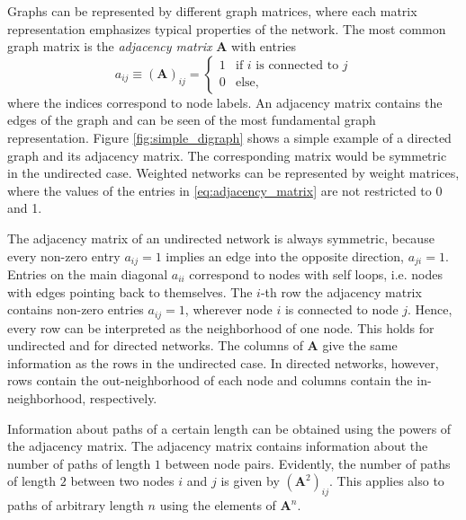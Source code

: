 Graphs can be represented by different graph matrices, where each matrix representation emphasizes typical properties of the network.
The most common graph matrix is the \emph{adjacency matrix} $\mathbf{A}$ with entries
\begin{equation}\label{eq:adjacency_matrix}
a_{ij}\equiv (\mathbf{A})_{ij}= 
\begin{cases}
1 & \text{if $i$ is connected to $j$} \\
0 & \text{else,}
\end{cases} 
\end{equation}
where the indices correspond to node labels.
An adjacency matrix contains the edges of the graph and can be seen of the most fundamental graph representation.
Figure \ref{fig:simple_digraph} shows a simple example of a directed graph and its adjacency matrix.
The corresponding matrix would be symmetric in the undirected case.
Weighted networks can be represented by weight matrices, where the values of the entries in \eqref{eq:adjacency_matrix} are not restricted to 0 and 1.

The adjacency matrix of an undirected network is always symmetric, because every non-zero entry $a_{ij}=1$ implies an edge into the opposite direction, $a_{ji}=1$.
Entries on the main diagonal $a_{ii}$ correspond to nodes with self loops, i.e. nodes with edges pointing back to themselves.
The $i$-th row the adjacency matrix contains non-zero entries $a_{ij}=1$, wherever node $i$ is connected to node $j$.
Hence, every row can be interpreted as the neighborhood of one node.
This holds for undirected and for directed networks.
The columns of $\mathbf{A}$ give the same information as the rows in the undirected case.
In directed networks, however, rows contain the out-neighborhood of each node and columns contain the in-neighborhood, respectively.

Information about paths of a certain length can be obtained using the powers of the adjacency matrix.
The adjacency matrix contains information about the number of paths of length $1$ between node pairs.
Evidently, the number of paths of length $2$ between two nodes $i$ and $j$ is given by $(\mathbf{A}^2)_{ij}$.
This applies also to paths of arbitrary length $n$ using the elements of $\mathbf{A}^n$.

